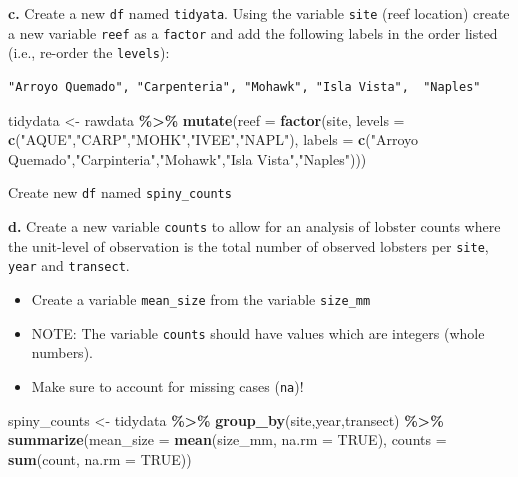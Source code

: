 \documentclass[
]{article}
\newenvironment{Shaded}{\begin{snugshade}}{\end{snugshade}}
\newcommand{\AttributeTok}[1]{\textcolor[rgb]{0.13,0.29,0.53}{#1}}
\newcommand{\ConstantTok}[1]{\textcolor[rgb]{0.56,0.35,0.01}{#1}}
\newcommand{\FunctionTok}[1]{\textcolor[rgb]{0.13,0.29,0.53}{\textbf{#1}}}
\newcommand{\NormalTok}[1]{#1}
\newcommand{\OtherTok}[1]{\textcolor[rgb]{0.56,0.35,0.01}{#1}}
\newcommand{\SpecialCharTok}[1]{\textcolor[rgb]{0.81,0.36,0.00}{\textbf{#1}}}
\newcommand{\StringTok}[1]{\textcolor[rgb]{0.31,0.60,0.02}{#1}}
\providecommand{\tightlist}{%
  \setlength{\itemsep}{0pt}\setlength{\parskip}{0pt}}
\begin{document}
\textbf{c.} Create a new \texttt{df} named \texttt{tidyata}. Using the
variable \texttt{site} (reef location) create a new variable
\texttt{reef} as a \texttt{factor} and add the following labels in the
order listed (i.e., re-order the \texttt{levels}):

\begin{verbatim}
"Arroyo Quemado", "Carpenteria", "Mohawk", "Isla Vista",  "Naples"
\end{verbatim}

\begin{Shaded}
\begin{Highlighting}[]
\NormalTok{tidydata }\OtherTok{\textless{}{-}}\NormalTok{ rawdata }\SpecialCharTok{\%\textgreater{}\%}
  \FunctionTok{mutate}\NormalTok{(}\AttributeTok{reef =} \FunctionTok{factor}\NormalTok{(site,}
                       \AttributeTok{levels =} \FunctionTok{c}\NormalTok{(}\StringTok{"AQUE"}\NormalTok{,}\StringTok{"CARP"}\NormalTok{,}\StringTok{"MOHK"}\NormalTok{,}\StringTok{"IVEE"}\NormalTok{,}\StringTok{"NAPL"}\NormalTok{),}
                       \AttributeTok{labels =} \FunctionTok{c}\NormalTok{(}\StringTok{"Arroyo Quemado"}\NormalTok{,}\StringTok{"Carpinteria"}\NormalTok{,}\StringTok{"Mohawk"}\NormalTok{,}\StringTok{"Isla Vista"}\NormalTok{,}\StringTok{"Naples"}\NormalTok{)))}
\end{Highlighting}
\end{Shaded}

Create new \texttt{df} named \texttt{spiny\_counts}

\textbf{d.} Create a new variable \texttt{counts} to allow for an
analysis of lobster counts where the unit-level of observation is the
total number of observed lobsters per \texttt{site}, \texttt{year} and
\texttt{transect}.

\begin{itemize}
\tightlist
\item
  Create a variable \texttt{mean\_size} from the variable
  \texttt{size\_mm}
\item
  NOTE: The variable \texttt{counts} should have values which are
  integers (whole numbers).
\item
  Make sure to account for missing cases (\texttt{na})!
\end{itemize}

\begin{Shaded}
\begin{Highlighting}[]
\NormalTok{spiny\_counts }\OtherTok{\textless{}{-}}\NormalTok{ tidydata }\SpecialCharTok{\%\textgreater{}\%}
  \FunctionTok{group\_by}\NormalTok{(site,year,transect) }\SpecialCharTok{\%\textgreater{}\%}
  \FunctionTok{summarize}\NormalTok{(}\AttributeTok{mean\_size =} \FunctionTok{mean}\NormalTok{(size\_mm, }
                             \AttributeTok{na.rm =} \ConstantTok{TRUE}\NormalTok{),}
            \AttributeTok{counts =} \FunctionTok{sum}\NormalTok{(count,}
                         \AttributeTok{na.rm =} \ConstantTok{TRUE}\NormalTok{))}
\end{Highlighting}
\end{Shaded}
\end{document}
